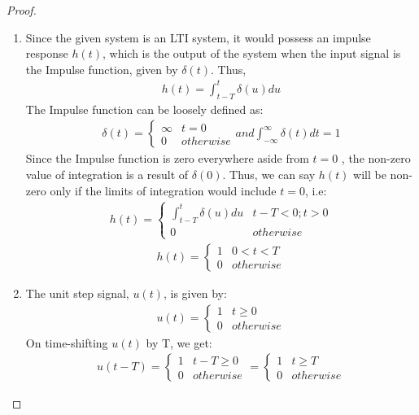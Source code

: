 \documentclass[journal,12pt,twocolumn]{IEEEtran}
\begin{document}
\begin{proof}
\begin{enumerate}
\item Since the given system is an LTI system, it would possess an impulse response $h(t)$, which is the output of the system when the input signal is the Impulse function, given by $\delta(t)$. Thus,
\begin{align}
    h(t) = \int_{t-T}^{t} \delta(u)du
\end{align}
The Impulse function can be loosely defined as:
\begin{align}
    \delta(t) = 
    \begin{cases}
\infty & t = 0\\
0 & otherwise
\end{cases}
and \int_{-\infty}^\infty \delta(t)dt  = 1
\end{align}
Since the Impulse function is zero everywhere aside from $t = 0$ , the non-zero value of integration is a result of $\delta(0)$. Thus, we can say $h(t)$ will be non-zero only if the limits of integration would include $t=0$, i.e:
\begin{align}
    h(t) = 
    \begin{cases}
    \int_{t-T}^{t} \delta(u)du & t-T<0 ; t>0\\
    0 & otherwise
    \end{cases}
    \end{align}
    \begin{align}
h(t) = 
    \begin{cases}
    1 & 0<t<T\\
    0 & otherwise
    \end{cases}
    \label{H}
\end{align}
\item The unit step signal, $u(t)$, is given by:
\begin{align}
    u(t) = 
    \begin{cases}
    1 & t\geq0\\
    0 & otherwise
    \end{cases}
    \label{u(t)}
\end{align}
On time-shifting $u(t)$ by T, we get:
\begin{align}
     u(t - T) = 
    \begin{cases}
    1 & t-T\geq 0\\
    0 & otherwise
    \end{cases}
    = 
    \begin{cases}
    1 & t\geq T\\
    0 & otherwise
    \end{cases}
    \label{u(t-T)}

\end{align}
\end{enumerate}
\end{proof}
\end{document}
